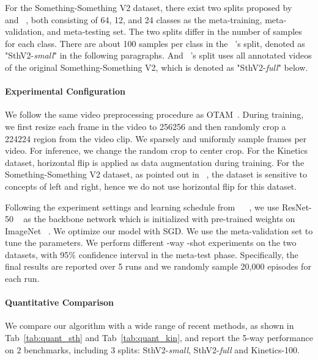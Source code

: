 \documentclass{article}
\begin{document}
For the Something-Something V2 dataset, there exist two splits proposed by ~\cite{cao2020few} and ~\cite{zhu2020label}, both consisting of 64, 12, and 24 classes as the meta-training, meta-validation, and meta-testing set. The two splits differ in the number of samples for each class. There are about 100 samples per class in the ~\cite{zhu2020label}'s split, denoted as "SthV2-\textit{small}" in the following paragraphs. And ~\cite{cao2020few}'s split uses all annotated videos of the original Something-Something V2, which is denoted as "SthV2-\textit{full}" below.



\paragraph{Experimental Configuration}

We follow the same video preprocessing procedure as OTAM~\cite{cao2020few}. During training, we first resize each frame in the video to 256256 and then randomly crop a 224224 region from the video clip. We sparsely and uniformly sample  frames per video. For inference, we change the random crop to center crop. For the Kinetics dataset, horizontal flip is applied as data augmentation during training. For the Something-Something V2 dataset, as pointed out in ~\cite{cao2020few}, the dataset is sensitive to concepts of left and right, hence we do not use horizontal flip for this dataset. 


Following the experiment settings and learning schedule from ~\cite{zhu2018compound} ~\cite{cao2020few}, we use ResNet-50 ~\cite{he2016deep} as the backbone network which is initialized with pre-trained weights on ImageNet ~\cite{deng2009imagenet}. We optimize our model with SGD. We use the meta-validation set to tune the parameters.
We perform different -way -shot experiments on the two datasets, with 95\% confidence interval in the meta-test phase. 
Specifically, the final results are reported over 5 runs and we randomly sample 20,000 episodes for each run. 






\paragraph{Quantitative Comparison}
We compare our algorithm with a wide range of recent methods, as shown in Tab~\ref{tab:quant_sth} and Tab~\ref{tab:quant_kin},
and report the 5-way performance on 2 benchmarks, including 3 splits: SthV2-\textit{small}, SthV2-\textit{full} and Kinetics-100. 
\end{document}
